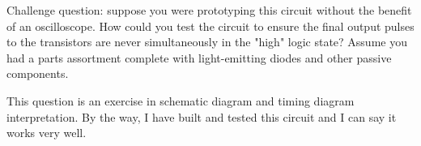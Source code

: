 Challenge question: suppose you were prototyping this circuit without the benefit of an oscilloscope.  How could you test the circuit to ensure the final output pulses to the transistors are never simultaneously in the "high" logic state?  Assume you had a parts assortment complete with light-emitting diodes and other passive components.







This question is an exercise in schematic diagram and timing diagram interpretation.  By the way, I have built and tested this circuit and I can say it works very well.




